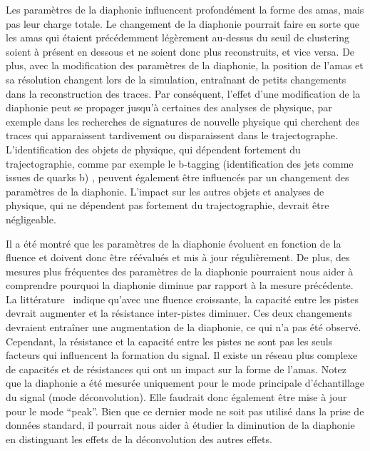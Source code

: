 Les paramètres de la diaphonie influencent profondément la forme des amas, mais pas leur charge totale. Le changement de la diaphonie pourrait faire en sorte que les amas qui étaient précédemment légèrement au-dessus du seuil de clustering soient à présent en dessous et ne soient donc plus reconstruits, et vice versa. De plus, avec la modification des paramètres de la diaphonie, la position de l'amas et sa résolution changent lors de la simulation, entraînant de petits changements dans la reconstruction des traces. Par conséquent, l'effet d'une modification de la diaphonie peut se propager jusqu'à certaines des analyses de physique, par exemple dans les recherches de signatures de nouvelle physique qui cherchent des traces qui apparaissent tardivement ou disparaissent dans le trajectographe. L'identification des objets de physique, qui dépendent fortement du trajectographie, comme par exemple le b-tagging (identification des jets comme issues de quarks b) , peuvent également être influencés par un changement des paramètres de la diaphonie. L'impact sur les autres objets et analyses de physique, qui ne dépendent pas fortement du trajectographie, devrait être négligeable.


Il a été montré que les paramètres de la diaphonie évoluent en fonction de la fluence et doivent donc être réévalués et mis à jour régulièrement. De plus, des mesures plus fréquentes des paramètres de la diaphonie pourraient nous aider à comprendre pourquoi la diaphonie diminue par rapport à la mesure précédente. La littérature~\cite{Hartmann:2017gzy} indique qu'avec une fluence croissante, la capacité entre les pistes devrait augmenter et la résistance inter-pistes diminuer. Ces deux changements devraient entraîner une augmentation de la diaphonie, ce qui n’a pas été observé. Cependant, la résistance et la capacité entre les pistes ne sont pas les seuls facteurs qui influencent la formation du signal. Il existe un réseau plus complexe de capacités et de résistances qui ont un impact sur la forme de l'amas. Notez que la diaphonie a été mesurée uniquement pour le mode principale d'échantillage du signal (mode déconvolution). Elle faudrait donc également être mise à jour pour le mode ``peak''. Bien que ce dernier mode ne soit pas utilisé dans la prise de données standard, il pourrait nous aider à étudier la diminution de la diaphonie en distinguant les effets de la déconvolution des autres effets.

